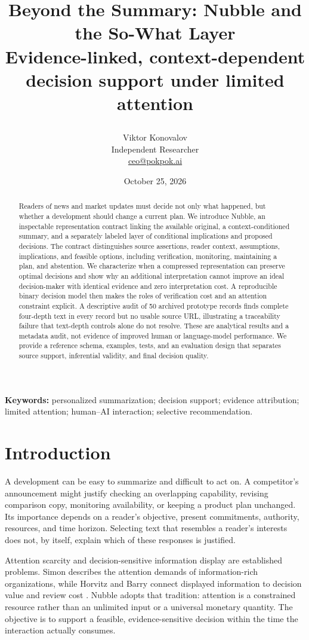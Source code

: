 \documentclass[11pt]{article}
\title{Beyond the Summary: Nubble and the So-What Layer\\[0.5em]{\large Evidence-linked, context-dependent decision support under limited attention}\par\smallskip{\small\textbf{Pre-submission draft: author review required.}}}
\author{Viktor Konovalov\\{\small Independent Researcher}\\{\small\href{mailto:ceo@pokpok.ai}{ceo@pokpok.ai}}}
\date{October 25, 2026}
\begin{document}
\maketitle
\begin{abstract}
Readers of news and market updates must decide not only what happened, but whether a development should change a current plan. We introduce Nubble, an inspectable representation contract linking the available original, a context-conditioned summary, and a separately labeled layer of conditional implications and proposed decisions. The contract distinguishes source assertions, reader context, assumptions, implications, and feasible options, including verification, monitoring, maintaining a plan, and abstention. We characterize when a compressed representation can preserve optimal decisions and show why an additional interpretation cannot improve an ideal decision-maker with identical evidence and zero interpretation cost. A reproducible binary decision model then makes the roles of verification cost and an attention constraint explicit. A descriptive audit of 50 archived prototype records finds complete four-depth text in every record but no usable source URL, illustrating a traceability failure that text-depth controls alone do not resolve. These are analytical results and a metadata audit, not evidence of improved human or language-model performance. We provide a reference schema, examples, tests, and an evaluation design that separates source support, inferential validity, and final decision quality.
\end{abstract}
\noindent\textbf{Keywords:} personalized summarization; decision support; evidence attribution; limited attention; human--AI interaction; selective recommendation.

\section{Introduction}

A development can be easy to summarize and difficult to act on. A competitor's announcement might justify checking an overlapping capability, revising comparison copy, monitoring availability, or keeping a product plan unchanged. Its importance depends on a reader's objective, present commitments, authority, resources, and time horizon. Selecting text that resembles a reader's interests does not, by itself, explain which of these responses is justified.

Attention scarcity and decision-sensitive information display are established problems. Simon describes the attention demands of information-rich organizations, while Horvitz and Barry connect displayed information to decision value and review cost \citep{simon1971attention,horvitz1995display}. Nubble adopts that tradition: attention is a constrained resource rather than an unlimited input or a universal monetary quantity. The objective is to support a feasible, evidence-sensitive decision within the time the interaction actually consumes.
\end{document}
